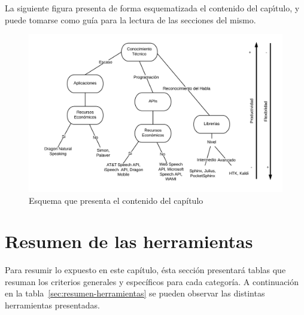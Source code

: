 La siguiente figura presenta de forma esquematizada el contenido del cap{\'\i}tulo, y puede tomarse como
gu\'ia para la lectura de las secciones del mismo.

\begin{figure}[H]
\centering
\includegraphics[width=0.9\linewidth]{./graphics/esquema-herramientas.png}
\caption{Esquema que presenta el contenido del cap\'itulo}
\label{figure:esquema-herramientas}
\end{figure}





\section{Resumen de las herramientas}

Para resumir lo expuesto en este cap\'itulo, \'esta secci\'on presentar\'a tablas que resuman los criterios generales y espec\'ificos
para cada categor\'ia. A continuaci\'on en la tabla~\ref{sec:resumen-herramientas} se pueden observar las distintas
herramientas presentadas.

